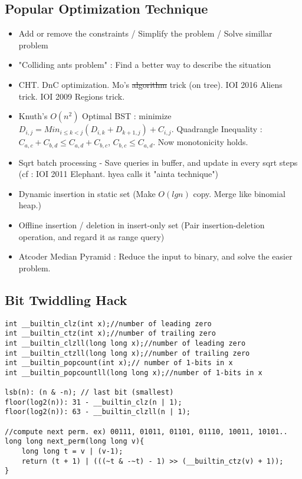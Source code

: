 \documentclass[landscape, 8pt, a4paper, oneside,  twocolumn]{extarticle}
\begin{document}
\subsection {Popular Optimization Technique}
\begin{itemize}
	\item Add or remove the constraints / Simplify the problem / Solve simillar problem
	\item "Colliding ants problem" : Find a better way to describe the situation
	\item CHT. DnC optimization. Mo's \sout{algorithm} trick (on tree). IOI 2016 Aliens trick. IOI 2009 Regions trick.
	\item Knuth's $O(n^2)$ Optimal BST : minimize $D_{i, j} = Min_{i \leq k < j}(D_{i, k} + D_{k+1, j}) + C_{i, j}$. Quadrangle Inequality : $C_{a, c} + C_{b, d} \leq C_{a, d} + C_{b, c}$, $C_{b, c} \leq C_{a, d}$. Now monotonicity holds. 
	\item Sqrt batch processing - Save queries in buffer, and update in every sqrt steps (cf : IOI 2011 Elephant. hyea calls it "ainta technique")
	\item Dynamic insertion in static set (Make $O(lgn)$ copy. Merge like binomial heap.)
	\item Offline insertion / deletion in insert-only set (Pair insertion-deletion operation, and regard it as range query)
	\item Atcoder Median Pyramid : Reduce the input to binary, and solve the easier problem.
\end{itemize}

\subsection {Bit Twiddling Hack}
\begin{verbatim}
int __builtin_clz(int x);//number of leading zero
int __builtin_ctz(int x);//number of trailing zero
int __builtin_clzll(long long x);//number of leading zero
int __builtin_ctzll(long long x);//number of trailing zero
int __builtin_popcount(int x);// number of 1-bits in x
int __builtin_popcountll(long long x);//number of 1-bits in x

lsb(n): (n & -n); // last bit (smallest)
floor(log2(n)): 31 - __builtin_clz(n | 1); 
floor(log2(n)): 63 - __builtin_clzll(n | 1);

//compute next perm. ex) 00111, 01011, 01101, 01110, 10011, 10101..
long long next_perm(long long v){
	long long t = v | (v-1);
	return (t + 1) | (((~t & -~t) - 1) >> (__builtin_ctz(v) + 1));
}
\end{verbatim}
\end{document}
